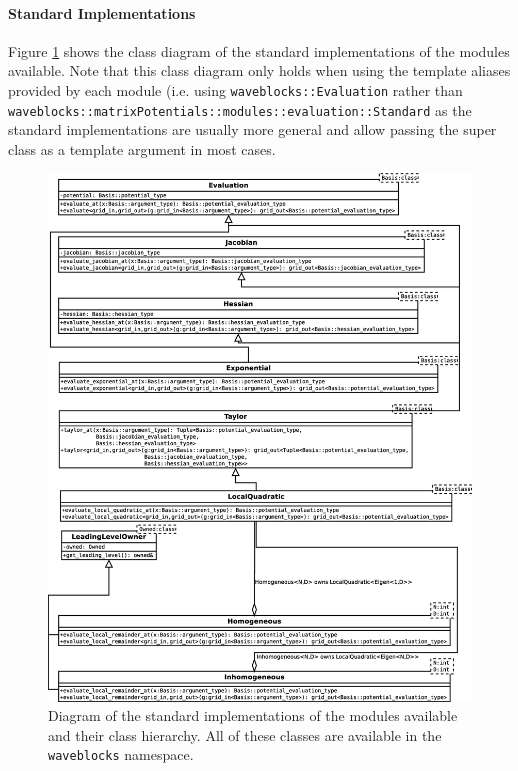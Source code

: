 \paragraph{Standard Implementations}
Figure \ref{fig:dia} shows the class diagram of the standard implementations of the modules available. Note that this class diagram only holds when using the template aliases provided by each module (i.e. using \texttt{waveblocks::Evaluation} rather than \texttt{waveblocks::matrixPotentials::modules::evaluation::Standard} as the standard implementations are usually more general and allow passing the super class as a template argument in most cases.
\begin{figure}
\includegraphics[width=\textwidth]{Figures/standardModules.eps}
\caption{Diagram of the standard implementations of the modules available and their class hierarchy. All of these classes are available in the \texttt{waveblocks} namespace.}
\label{fig:dia}
\end{figure}
